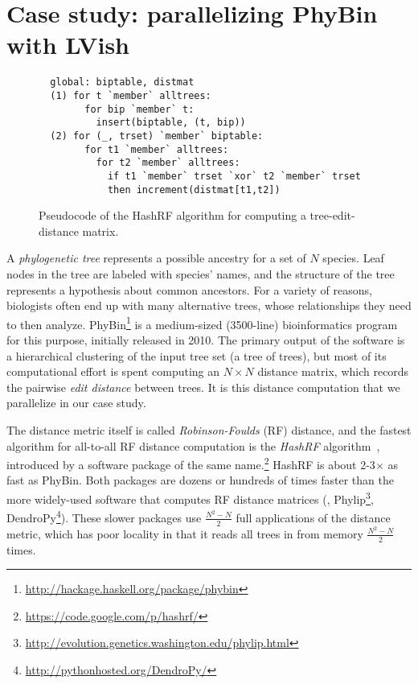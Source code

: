 \section{Case study: parallelizing PhyBin with LVish}\label{s:lvish-phybin}


\begin{figure}
  \centering
\begin{lstlisting}
  global: biptable, distmat
  (1) for t `member` alltrees:
        for bip `member` t:
          insert(biptable, (t, bip))
  (2) for (_, trset) `member` biptable: 
        for t1 `member` alltrees:
          for t2 `member` alltrees:
            if t1 `member` trset `xor` t2 `member` trset
            then increment(distmat[t1,t2])
\end{lstlisting}  
  \caption{Pseudocode of the HashRF algorithm for computing a tree-edit-distance matrix.}
  \label{f:hashrf-alg}
\end{figure}


A {\em phylogenetic tree} represents a possible ancestry for a set of $N$ species.
Leaf nodes in the tree are labeled with species' names, and the structure of the
tree represents a hypothesis about common ancestors. For a variety of reasons, biologists often end up
with many alternative trees, whose relationships they need to then analyze.
PhyBin\footnote{\url{http://hackage.haskell.org/package/phybin}} is a medium-sized (3500-line)
bioinformatics program for this purpose, initially released in 2010.
%
The primary output of the 
software is a hierarchical clustering of the input tree set (a tree
of trees), but most of its computational effort is spent computing an
$N{\times}N$ 
distance matrix, which records the pairwise 
{\em edit distance} between trees.
It is this distance computation that we parallelize in our case study.

The distance metric itself is called {\em Robinson-Foulds} (RF) distance, and
the fastest algorithm for all-to-all RF distance computation is the {\em HashRF}
algorithm~\cite{hashrf}, introduced by a software package of the same name.\footnote{\url{https://code.google.com/p/hashrf/}}  HashRF is about
2-3$\times$ as fast as PhyBin.  Both packages are dozens or hundreds of times faster
than the more widely-used software that computes RF distance matrices (\eg{}, Phylip\footnote{\url{http://evolution.genetics.washington.edu/phylip.html}}, DendroPy\footnote{\url{http://pythonhosted.org/DendroPy/}}).  These
slower packages use $\frac{N^2-N}{2}$ full applications of the distance metric, which has poor
locality in that it reads all trees in from memory $\frac{N^2-N}{2}$ times.
%

